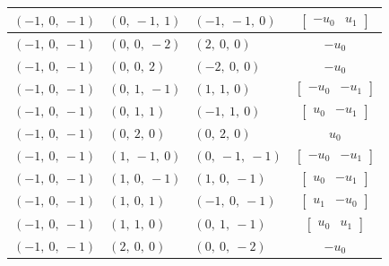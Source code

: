 \documentclass[11pt]{article}
\theoremstyle{definition}
\begin{document}
\begin{longtable}{|l|l|l|c|}
    \hline
    $\left( -1, \  0, \  -1\right)$ & $\left( 0, \  -1, \  1\right)$ & $\left( -1, \  -1, \  0\right)$ & $\left[\begin{matrix}- u_{0} & u_{1}\end{matrix}\right]$ \\
    \hline
    $\left( -1, \  0, \  -1\right)$ & $\left( 0, \  0, \  -2\right)$ & $\left( 2, \  0, \  0\right)$ & $- u_{0}$ \\
    \hline
    $\left( -1, \  0, \  -1\right)$ & $\left( 0, \  0, \  2\right)$ & $\left( -2, \  0, \  0\right)$ & $- u_{0}$ \\
    \hline
    $\left( -1, \  0, \  -1\right)$ & $\left( 0, \  1, \  -1\right)$ & $\left( 1, \  1, \  0\right)$ & $\left[\begin{matrix}- u_{0} & - u_{1}\end{matrix}\right]$ \\
    \hline
    $\left( -1, \  0, \  -1\right)$ & $\left( 0, \  1, \  1\right)$ & $\left( -1, \  1, \  0\right)$ & $\left[\begin{matrix}u_{0} & - u_{1}\end{matrix}\right]$ \\
    \hline
    $\left( -1, \  0, \  -1\right)$ & $\left( 0, \  2, \  0\right)$ & $\left( 0, \  2, \  0\right)$ & $u_{0}$ \\
    \hline
    $\left( -1, \  0, \  -1\right)$ & $\left( 1, \  -1, \  0\right)$ & $\left( 0, \  -1, \  -1\right)$ & $\left[\begin{matrix}- u_{0} & - u_{1}\end{matrix}\right]$ \\
    \hline
    $\left( -1, \  0, \  -1\right)$ & $\left( 1, \  0, \  -1\right)$ & $\left( 1, \  0, \  -1\right)$ & $\left[\begin{matrix}u_{0} & - u_{1}\end{matrix}\right]$ \\
    \hline
    $\left( -1, \  0, \  -1\right)$ & $\left( 1, \  0, \  1\right)$ & $\left( -1, \  0, \  -1\right)$ & $\left[\begin{matrix}u_{1} & - u_{0}\end{matrix}\right]$ \\
    \hline
    $\left( -1, \  0, \  -1\right)$ & $\left( 1, \  1, \  0\right)$ & $\left( 0, \  1, \  -1\right)$ & $\left[\begin{matrix}u_{0} & u_{1}\end{matrix}\right]$ \\
    \hline
    $\left( -1, \  0, \  -1\right)$ & $\left( 2, \  0, \  0\right)$ & $\left( 0, \  0, \  -2\right)$ & $- u_{0}$ \\

\end{longtable}
\end{document}
